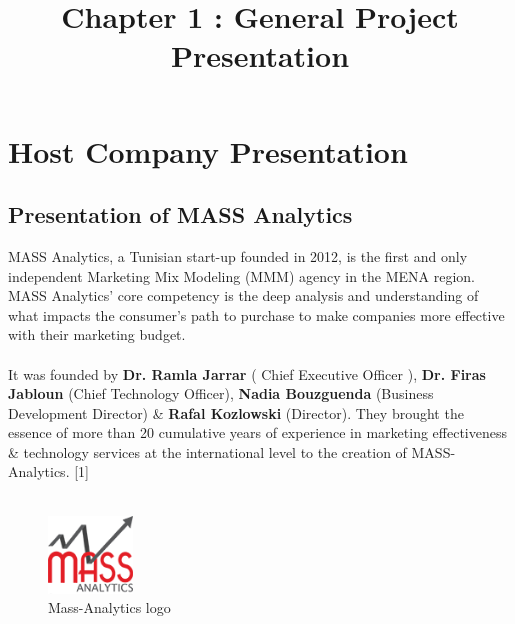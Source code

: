 \documentclass[12pt]{article}
\begin{document}
	\listoffigures
	\title{Chapter 1 : General Project Presentation}
	\maketitle

	\section{Host Company Presentation}
	
	\subsection{Presentation of MASS Analytics}
	MASS Analytics, a Tunisian start-up founded in 2012, is the first and only independent Marketing Mix Modeling (MMM) agency in the MENA region. MASS Analytics’ core competency is the deep analysis and understanding of what impacts the consumer's path to purchase to make companies more effective with their marketing budget.
	\\
	\\
	It was founded by \textbf{Dr. Ramla Jarrar } ( Chief Executive Officer ),  \textbf{Dr. Firas Jabloun } (Chief Technology Officer), \textbf{Nadia Bouzguenda} (Business Development Director) \& \textbf{Rafal Kozlowski} (Director). They brought the essence of more than 20 cumulative years of experience in marketing effectiveness \& technology services at the international level to the creation of MASS-Analytics. [1]
	\\
	\\
	\begin{figure}[h]
	\centering
	\includegraphics[width=0.2\textwidth]{Mass_logo.png}
	\caption{Mass-Analytics logo}
    \end{figure}
\end{document}
